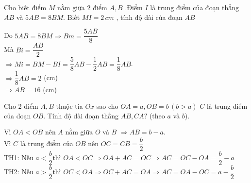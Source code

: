 \begin{bt}
	Cho biết điểm $M$ nằm giữa 2 điểm $A,B$ .Điểm  $I$ là trung điểm của đoạn thẳng $AB$  và  $5AB=8BM$.  Biết  $MI=2\,cm$ , tính độ dài của đoạn $AB$ 
	\begin{loigiaichuong29}
		Do $5AB = 8BM \Rightarrow Bm = \dfrac{5AB}{8}$\\
		Mà $Bi = \dfrac{AB}{2}$\\
		$\Rightarrow Mi = BM - BI = \dfrac{5}{8}AB - \dfrac{1}{2}AB = \dfrac{1}{8} AB$.\\
		$\Rightarrow \dfrac{1}{8} AB = 2$ (cm)\\
		$\Rightarrow AB = 16$ (cm)
	\end{loigiaichuong29}
	\begin{center}
	\end{center}
\end{bt}
\begin{bt}
	Cho 2 điểm $A,B$ thuộc tia  $Ox$  sao cho  $OA=a,OB=b\,(b>a)$ 
	$C$ là trung điểm của đoạn $OB.$  Tính độ dài đoạn thẳng  $AB,CA?$ (theo  $a$  và  $b$).
	\begin{loigiaichuong29}
		Vì $OA<OB$ nên $A$ nằm giữa $O$ và $B$ $\Rightarrow AB=b-a$.\\
		Vì $C$ là trung điểm của $OB$ nên $OC=CB=\dfrac{b}{2}$\\
		TH1: Nếu $a<\dfrac{b}{2}$thì $OA<OC\Rightarrow OA+AC=OC\Rightarrow AC=OC-OA=\dfrac{b}{2}-a$\\
		TH2: Nếu $a>\dfrac{b}{2}$thì $OC<OA\Rightarrow OC+AC=OA\Rightarrow AC=OA-OC=a-\dfrac{b}{2}$
		\begin{center}
		\end{center}
	\end{loigiaichuong29}
\end{bt}
